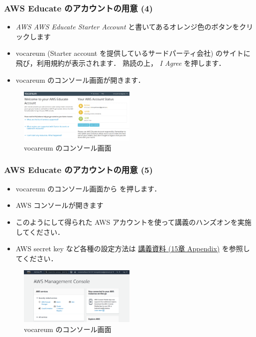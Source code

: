 \documentclass[unicode,11pt]{beamer}
\begin{document}
\begin{frame}
\frametitle{AWS Educate のアカウントの用意 (4)}

\begin{itemize}
    \item \emph{AWS AWS Educate Starter Account} と書いてあるオレンジ色のボタンをクリックします
    \item vocareum (Starter account を提供しているサードパーティ会社) のサイトに飛び，利用規約が表示されます．
    熟読の上， \emph{I Agree} を押します．
    \item vocareum のコンソール画面が開きます．
\end{itemize}

\begin{figure}
    \centering
    \includegraphics[width=0.5\textwidth]{imgs/vocareum_screenshot.png}
    \caption{vocareum のコンソール画面}
\end{figure}

\end{frame}

\begin{frame}
\frametitle{AWS Educate のアカウントの用意 (5)}

\begin{itemize}
    \item vocareum のコンソール画面から \emph{} を押します．
    \item AWS コンソールが開きます
    \item このようにして得られた AWS アカウントを使って講義のハンズオンを実施してください．
    \item AWS secret key など各種の設定方法は \href{https://tomomano.github.io/learn-aws-by-coding/}{講義資料 (15章 Appendix)} を参照してください．
\end{itemize}

\begin{figure}
    \centering
    \includegraphics[width=0.5\textwidth]{imgs/aws_console_screenshot.png}
    \caption{vocareum のコンソール画面}
\end{figure}

\end{frame}
\end{document}

